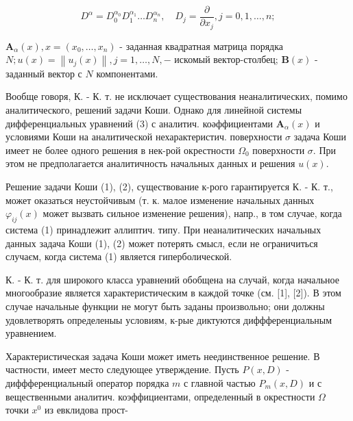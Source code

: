 \documentclass[10pt]{article}
\begin{document}
\[

D^{\alpha}=D_{0}^{\alpha_{0}} D_{1}^{\alpha_{1}} \ldots D_{n}^{\alpha_{n}}, \quad D_{j}=\frac{\partial}{\partial x_{j}}, j=0,1, \ldots, n ;

\]



$\boldsymbol{A}_{\alpha}(x), x=\left(x_{0}, \ldots, x_{n}\right)$ - заданная квадратная матрица порядка $N ; u(x)=\left\|u_{j}(x)\right\|, j=1, \ldots, N,-$ искомый вектор-столбец; $\boldsymbol{B}(x)$ - заданный вектор с $N$ компонентами.



Вообще говоря, К. - К. т. не исключает существования неаналитических, помимо аналитического, решений задачи Коши. Однако для линейной системы дифференциальных уравнений (3) с аналитич. коәффициентами $\boldsymbol{A}_{\alpha}(x)$ и условиями Коши на аналитической нехарактеристич. поверхности $\sigma$ задача Коши имеет не более одного решения в нек-рой окрестности $\Omega_{0}$ поверхности $\sigma$. При этом не предполагается аналитичность начальных данных и решения $u(x)$.



Решение задачи Коши (1), (2), существование к-рого гарантируется К. - К. т., может оказаться неустойчивым (т. к. малое изменение начальных данных $\varphi_{i j}(x)$ может вызвать сильное изменение решения), напр., в том случае, когда система (1) принадлежит әллиптич. типу. При неаналитических начальных данных задача Коши (1), (2) может потерять смысл, если не ограничиться случаєм, когда система (1) является гиперболической.



К. - К. т. для широкого класса уравнений обобщена на случай, когда начальное многообразие является характеристическим в каждой точке (см. [1], [2]). В этом случае начальные функции не могут быть заданы произвольно; они должны удовлетворять определеныы условиям, к-рые диктуются диффференциальным уравнением.



Характеристическая задача Коши может иметь неединственное решение. В частности, имеет место следующее утверждение. Пусть $P(x, D)$ - диффференциальный оператор порядка $m$ с главной частью $P_{m}(x, D)$ и с вещественными аналитич. коэффициентами, определенный в окрестности $\Omega$ точки $x^{0}$ из евклидова прост-
\end{document}
